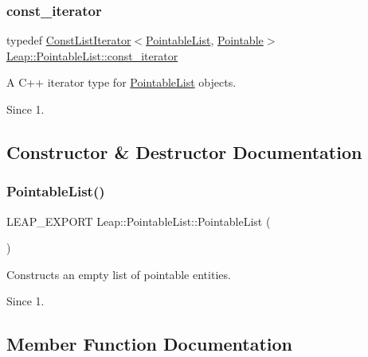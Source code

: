 \subsubsection{\texorpdfstring{const\+\_\+iterator}{const\_iterator}}
{\footnotesize\ttfamily typedef \hyperlink{class_leap_1_1_const_list_iterator}{Const\+List\+Iterator}$<$\hyperlink{class_leap_1_1_pointable_list}{Pointable\+List}, \hyperlink{class_leap_1_1_pointable}{Pointable}$>$ \hyperlink{class_leap_1_1_pointable_list_a12b640b8c7e70885884a3a6ee903c21c}{Leap\+::\+Pointable\+List\+::const\+\_\+iterator}}

A C++ iterator type for \hyperlink{class_leap_1_1_pointable_list}{Pointable\+List} objects.


\begin{DoxyCodeInclude}
\end{DoxyCodeInclude}


\begin{DoxySince}{Since}
1. 
\end{DoxySince}


\subsection{Constructor \& Destructor Documentation}
\mbox{\label{class_leap_1_1_pointable_list_ad8ba234f2a9491dd9c1062432e40ebf5}} 
\subsubsection{\texorpdfstring{Pointable\+List()}{PointableList()}}
{\footnotesize\ttfamily L\+E\+A\+P\+\_\+\+E\+X\+P\+O\+RT Leap\+::\+Pointable\+List\+::\+Pointable\+List (\begin{DoxyParamCaption}{ }\end{DoxyParamCaption})}

Constructs an empty list of pointable entities. \begin{DoxySince}{Since}
1. 
\end{DoxySince}


\subsection{Member Function Documentation}
\mbox{\label{class_leap_1_1_pointable_list_a415fee35b60e79f69a440096d6818d75}} 
